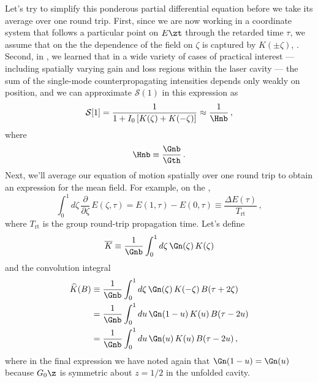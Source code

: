 Let's try to simplify this ponderous partial differential equation before we take its average over one round trip. First, since we are now working in a coordinate system that follows a particular point on $E\zt$ through the retarded time $\tau$, we assume that on the \rhs the dependence of the field on $\zeta$ is captured by $K(\pm\zeta)$, . Second, in , we learned that in a wide variety of cases of practical interest --- including spatially varying gain and loss regions within the laser cavity --- the sum of the single-mode counterpropagating intensities depends only weakly on position, and we can approximate $\mathcal{S}(1)$ in this expression as
\begin{equation}
    \mathcal{S}[1] = \frac{1}{1 + I_0 \left[K(\zeta) + K(-\zeta)\right]} \approx \frac{1}{\Hnb}\, ,
\end{equation}
where
\begin{equation} \label{eqn:mflt_hnb_def}
    \Hnb \equiv \frac{\Gnb}{\Gth}\, .
\end{equation}
Next, we'll average our equation of motion spatially over one round trip to obtain an expression for the mean field. For example, on the \lhs,
\begin{equation}
    \int_{0}^{1} d \zeta\, \frac{\partial}{\partial \zeta}\, E(\zeta, \tau) = E(1, \tau) - E(0, \tau) \equiv \frac{\Delta E(\tau)}{T_\textrm{rt}}\, ,
\end{equation}
where $T_\textrm{rt}$ is the group round-trip propagation time. Let's define
\begin{equation} \label{eqn:mflt_kbar_def}
    \overline{K} \equiv \frac{1}{\Gnb} \int_{0}^{1} d \zeta\, \Gn(\zeta)\, K(\zeta)
\end{equation}
and the convolution integral
\begin{equation}
    \begin{split}
        \widehat{K}(B) &\equiv \frac{1}{\Gnb} \int_{0}^{1} d \zeta\, \Gn(\zeta)\, K(-\zeta)\, B(\tau + 2 \zeta) \\
        &= \frac{1}{\Gnb} \int_{0}^{1} d u\, \Gn(1 - u)\, K(u)\, B(\tau - 2 u) \\
        &= \frac{1}{\Gnb} \int_{0}^{1} d u\, \Gn(u)\, K(u)\, B(\tau - 2 u)\, ,
    \end{split}
\end{equation}
where in the final expression we have noted again that $\Gn(1 - u) = \Gn(u)$ because $G_0\z$ is symmetric about $z = 1/2$ in the unfolded cavity.

